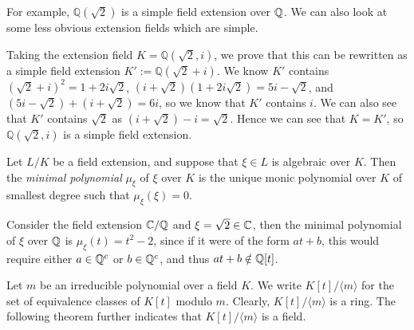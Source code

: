 For example, \(\mathbb{Q}(\sqrt{2})\) is a simple field extension over \(\mathbb Q\). We can also look at some less obvious extension fields which are simple.
\begin{example}
Taking the extension field \(K = \mathbb{Q}(\sqrt{2}, i)\), we prove that this can be rewritten as a simple field extension \(K' := \mathbb{Q}(\sqrt{2} + i)\). We know \(K'\) contains
$(\sqrt{2} + i)^2 = 1 + 2i\sqrt{2}$, $(i + \sqrt{2})(1+2i\sqrt{2}) = 5i - \sqrt{2}$, and 
$(5i - \sqrt{2}) + (i + \sqrt{2}) = 6i$, 
so we know that \(K'\) contains \(i\). We can also see that \(K'\) contains \(\sqrt{2}\) as \((i+\sqrt{2})-i = \sqrt{2}\). Hence we can see that \(K = K'\), so \(\mathbb{Q}(\sqrt{2},i)\) is a simple field extension.
\end{example}


\begin{definition}
    Let $L / K$ be a field extension, and suppose that $\xi \in L$ is algebraic over $K$. Then the \textit{minimal polynomial} $\mu_\xi$  of $\xi$ over $K$ is the unique monic polynomial over $K$ of smallest degree such that $\mu_\xi(\xi)=0$.



\end{definition}


\begin{example}
    Consider the field extension $\mathbb C / \mathbb Q$ and $\xi = \sqrt{2} \in \mathbb C$, then the minimal polynomial of $\xi$ over $\mathbb Q$ is $\mu_\xi(t)=t^2-2$, since if it were of the form $at+b$, this would require either $a \in \mathbb Q^c$ or $b \in \mathbb Q^c$, and thus $at+b \notin \mathbb Q[t]$.
\end{example}

Let $m$ be an irreducible polynomial over a field $K$. We write
$
K[t] /\langle m\rangle
$
for the set of equivalence classes of $K[t]$ modulo $m$. Clearly, $K[t] /\langle m\rangle$ is a ring. 
The following theorem further indicates that $K[t] / \langle m \rangle$ is a field. 


